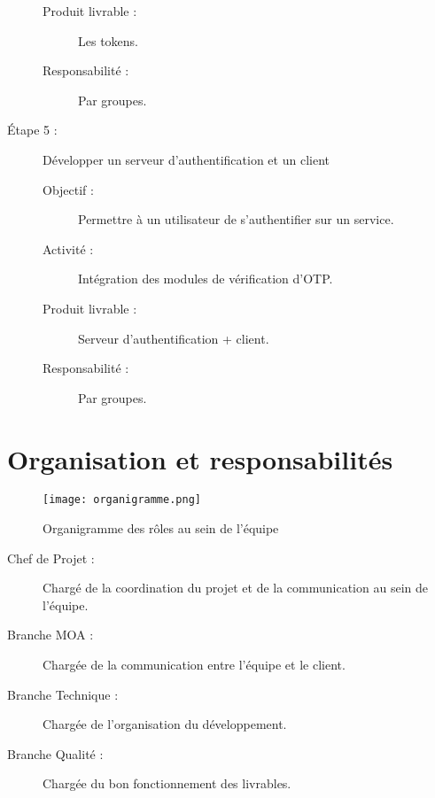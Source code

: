 \documentclass{../../res/univ-projet}
\begin{document}
\begin{description}
\begin{description}
		        \item [Produit livrable :] Les tokens.
		        \item [Responsabilité :]  Par groupes.
		    \end{description}
	    \item [Étape 5 :] Développer un serveur d'authentification et un client
		    \begin{description}
		        \item [Objectif :] Permettre à un utilisateur de s'authentifier sur un service.
		        \item [Activité :] Intégration des modules de vérification d'OTP.
		        \item [Produit livrable :] Serveur d'authentification + client.
		        \item [Responsabilité :] Par groupes.
	        \end{description}
    \end{description}
\newpage
\section{Organisation et responsabilités}
\begin{figure}[h]
\texttt{[image: organigramme.png]}
\caption{Organigramme des rôles au sein de l'équipe}
\end{figure}
\begin{description}
\item[Chef de Projet :] Chargé de la coordination du projet et de la communication au sein de l'équipe.
\item[Branche MOA :] Chargée de la communication entre l'équipe et le client.
\item[Branche Technique :] Chargée de l'organisation du développement.
\item[Branche Qualité :] Chargée du bon fonctionnement des livrables. 
\end{description}
\newpage



\end{document}
